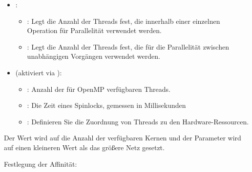 \begin{itemize}
    \item {}:
    \begin{itemize}
        \item {}: Legt die Anzahl der Threads fest, die innerhalb einer einzelnen Operation für Parallelität verwendet werden.
        \item {}: Legt die Anzahl der Threads fest, die für die Parallelität zwischen unabhängigen Vorgängen verwendet werden.
    \end{itemize}
    \item {} (aktiviert via ):
    \begin{itemize}
        \item {}: Anzahl der für OpenMP verfügbaren Threads.
        \item {}: Die Zeit eines Spinlocks, gemessen in Millisekunden
        \item {}: Definieren Sie die Zuordnung von Threads zu den Hardware-Ressourcen.
    \end{itemize}
\end{itemize}




Der Wert  wird auf die Anzahl der verfügbaren Kernen und der Parameter  wird auf einen kleineren Wert als das größere Netz gesetzt.

\bigskip

Festlegung der Affinität:


\bigskip


